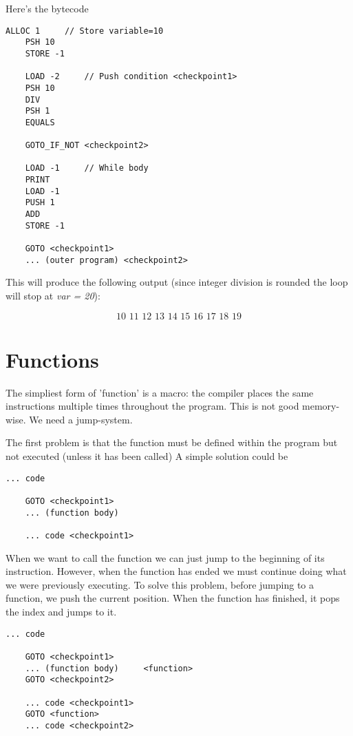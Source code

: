\documentclass{article}
\begin{document}
\pagebreak

Here's the bytecode

\begin{lstlisting}[style=generic]
    ALLOC 1     // Store variable=10
    PSH 10
    STORE -1
    
    LOAD -2     // Push condition <checkpoint1>
    PSH 10
    DIV
    PSH 1
    EQUALS
    
    GOTO_IF_NOT <checkpoint2>
    
    LOAD -1     // While body
    PRINT
    LOAD -1
    PUSH 1
    ADD
    STORE -1

    GOTO <checkpoint1>
    ... (outer program) <checkpoint2>
\end{lstlisting}

This will produce the following output (since integer division is rounded the loop will stop at \textit{var = 20}):

\[
    10\,\,11\,\,12\,\,13\,\,14\,\,15\,\,16\,\,17\,\,18\,\,19
\]

\section{Functions}

The simpliest form of 'function' is a macro: the compiler places the same instructions multiple times throughout the program.
This is not good memory-wise. We need a jump-system.

The first problem is that the function must be defined within the program but not executed (unless it has been called)
A simple solution could be

\begin{lstlisting}[style=generic]
    ... code

    GOTO <checkpoint1>
    ... (function body)

    ... code <checkpoint1>
\end{lstlisting}

When we want to call the function we can just jump to the beginning of its instruction.
However, when the function has ended we must continue doing what we were previously executing.
To solve this problem, before jumping to a function, we push the current position.
When the function has finished, it pops the index and jumps to it.

\begin{lstlisting}[style=generic]
    ... code

    GOTO <checkpoint1>
    ... (function body)     <function>
    GOTO <checkpoint2>
    
    ... code <checkpoint1>
    GOTO <function>
    ... code <checkpoint2>
\end{lstlisting}
\end{document}
